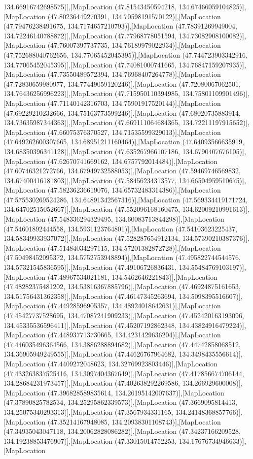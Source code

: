 134.66916742698575)],[MapLocation (47.81543450594218, 134.67466059104825)],[MapLocation (47.80236449270391, 134.70598191570122)],[MapLocation (47.79476238491675, 134.7174657210793)],[MapLocation (47.78391269949004, 134.72246140788872)],[MapLocation (47.77968778051594, 134.73082908100082)],[MapLocation (47.76007397737735, 134.76189979022934)],[MapLocation (47.752688040762656, 134.77065452045395)],[MapLocation (47.744723903342916, 134.77065452045395)],[MapLocation (47.74081000741665, 134.76847159207935)],[MapLocation (47.73550489572394, 134.76968407264778)],[MapLocation (47.72830659980977, 134.77449059120246)],[MapLocation (47.72080067062501, 134.76436256996223)],[MapLocation (47.715950110394985, 134.75801109901496)],[MapLocation (47.71140142316703, 134.75901917520144)],[MapLocation (47.69229210232666, 134.75163773599246)],[MapLocation (47.68020735883914, 134.73635987344363)],[MapLocation (47.669111064684365, 134.72211197915652)],[MapLocation (47.66075376370527, 134.71535599329013)],[MapLocation (47.649262600307665, 134.68951211160464)],[MapLocation (47.64093566635919, 134.68350396341128)],[MapLocation (47.635267966107186, 134.6790407676105)],[MapLocation (47.62670741669162, 134.6757792014484)],[MapLocation (47.60746321272766, 134.67949732588053)],[MapLocation (47.59469746569832, 134.67400416181803)],[MapLocation (47.58456234313577, 134.66504959510675)],[MapLocation (47.58236236619076, 134.65732483314386)],[MapLocation (47.575530269524286, 134.64891342567316)],[MapLocation (47.569334419171724, 134.64702515052667)],[MapLocation (47.552096168160475, 134.62009210991613)],[MapLocation (47.548336294329495, 134.60083713844298)],[MapLocation (47.54601892444558, 134.5931123764801)],[MapLocation (47.54103623225437, 134.58349933937072)],[MapLocation (47.528287654912134, 134.57390210387376)],[MapLocation (47.51484034297115, 134.57201382872728)],[MapLocation (47.50498452095372, 134.5752753948894)],[MapLocation (47.495822744544576, 134.57321545836595)],[MapLocation (47.49106726836431, 134.55484769103197)],[MapLocation (47.48967534021181, 134.5462646221843)],[MapLocation (47.48282375481202, 134.53816367885796)],[MapLocation (47.46924875161653, 134.51756431362358)],[MapLocation (47.46147345263694, 134.5098395516607)],[MapLocation (47.44928596905357, 134.48924018642631)],[MapLocation (47.45427737528695, 134.47087241909233)],[MapLocation (47.452420163193096, 134.45335536596411)],[MapLocation (47.45207192862348, 134.43824916479224)],[MapLocation (47.448937713730665, 134.4231429636204)],[MapLocation (47.446035496364566, 134.3886288894682)],[MapLocation (47.44742858068512, 134.36905949249555)],[MapLocation (47.44626767964682, 134.3498435556614)],[MapLocation (47.4409272048623, 134.32769923803446)],[MapLocation (47.433263837525416, 134.3097404367649)],[MapLocation (47.417856674706144, 134.28684231973457)],[MapLocation (47.402638292269586, 134.266929600008)],[MapLocation (47.396828589835614, 134.26195142007637)],[MapLocation (47.37890825782534, 134.25295862339573)],[MapLocation (47.3669095814413, 134.25075340293313)],[MapLocation (47.3567934331165, 134.24148368857766)],[MapLocation (47.35214167948085, 134.20938301108743)],[MapLocation (47.34935043047118, 134.20062828086282)],[MapLocation (47.34237166209528, 134.19238853476907)],[MapLocation (47.33015014752253, 134.17676734946633)],[MapLocation 